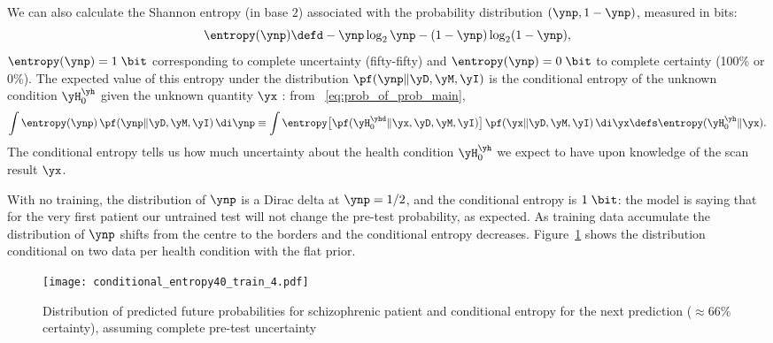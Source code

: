 We can also calculate the Shannon entropy (in base $2$) associated with the
probability distribution $(\ynp, 1-\ynp)$, measured in bits:
\begin{equation}
  \entropy(\ynp) \defd -\ynp\log_2\ynp - (1-\ynp)\log_2(1-\ynp),
  \label{eq:entropy_def}
\end{equation}
$\entropy(\ynp)=1\;\bit$ corresponding to complete uncertainty
(fifty-fifty) and $\entropy(\ynp)=0\;\bit$ to complete certainty (100\% or
0\%). The expected value of this entropy under the distribution
$\pf(\ynp \| \yD, \yM, \yI)$ is the conditional entropy of the unknown
condition $\yH_0^{\yh}$ given the unknown quantity $\yx$ \citep[\sects~2.2,
8.4]{coveretal1991_r2006}: from \eqn~\eqref{eq:prob_of_prob_main},
\begin{equation}
  \label{eq:conditional_entropy_equivalence}
  \int \entropy(\ynp) \, \pf(\ynp \| \yD, \yM, \yI) \,\di\ynp
  \equiv
  \int \entropy\bigl[\pf(\yH_0^{\yhd} \| \yx,\yD, \yM, \yI)\bigr]
  \, \pf(\yx \| \yD, \yM, \yI)\,\di\yx
  \defs \entropy(\yH_0^{\yh} \|\yx).
\end{equation}
The conditional entropy tells us how much uncertainty about the health
condition $\yH_0^{\yh}$ we expect to have upon knowledge of the scan result
$\yx$.

With no training, the distribution of $\ynp$ is a Dirac delta at
$\ynp=1/2$, and the conditional entropy is $1\;\bit$: the model is
saying that for the very first patient our untrained test will not change
the pre-test probability, as expected. As training data accumulate the
distribution of $\ynp$ shifts from the centre to the borders and the
conditional entropy decreases. Figure~\ref{fig:cond_entropy_4data} shows
the distribution conditional on two data per health condition with the flat prior.
\begin{figure}[!h]
  \centering
\texttt{[image: conditional\_entropy40\_train\_4.pdf]}%
\caption{Distribution of predicted future probabilities for schizophrenic
  patient and conditional entropy for the next prediction ($\approx 66\%$
  certainty), assuming complete pre-test uncertainty}
\label{fig:cond_entropy_4data}
\end{figure}


